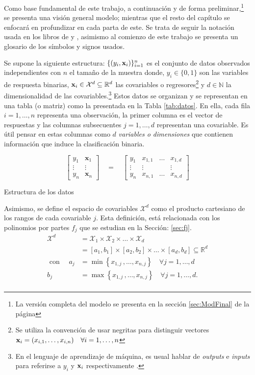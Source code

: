 \documentclass[../Main/Main.tex]{subfiles}
\begin{document}
Como base fundamental de este trabajo, a continuación y de forma preliminar,\footnote{La versión completa del modelo se presenta en la sección \ref{sec:ModFinal} de la página \pageref{sec:ModFinal}} se presenta una visión general modelo; mientras que el resto del capítulo se enfocará en profundizar en cada parta de este. Se trata de seguir la notación usada en los libros de  \citet{hastie2008elements} y \citet{james2013introduction}, asimismo al comienzo de este trabajo se presenta un glosario de los símbolos y signos usados.

Se supone la siguiente estructura: $\{(y_i,\mathbf{x}_i)\}_{i = 1}^n$ es el conjunto de datos observados independientes con $n$ el tamaño de la muestra donde, $y_i \in \{0,1\}$ son las variables de respuesta binarias, $\mathbf{x}_i \in \mathcal{X}^d \subseteq \mathbb{R}^d$ las covariables o regresores\footnote{Se utiliza la convención de usar negritas para distinguir vectores $\mathbf{x}_i = (x_{i,1},\ldots,x_{i,n}) \quad \forall i = 1,\ldots,n$} y $d \in \mathbb{N}$ la dimensionalidad de las covariables.\footnote{En el lenguaje de aprendizaje de máquina, es usual hablar de \textit{outputs} e \textit{inputs} para referirse a $y_i$ y $\mathbf{x}_i$ respectivamente \autocite{alpaydin2014introduction}.} Estos datos se organizan y se representan en una tabla (o matriz) como la presentada en la Tabla \ref{tab:datos}. En ella, cada fila $i = 1,\ldots,n$ representa una observación, la primer columna es el vector de respuestas y las columnas subsecuentes $j = 1,\ldots,d$ representan una covariable. Es útil pensar en estas columnas como $d$ \textit{variables o dimensiones} que contienen información que induce la clasificación binaria.
\begin{table}[h]
$$
\left[\begin{array}{c|c} 
y_1 & \mathbf{x}_1 \\ 
\vdots & \vdots \\ 
y_n & \mathbf{x}_n \end{array}\right] 
\quad = \quad
\left[\begin{array}{c|ccc} 
y_1 & x_{1,1} & \ldots & x_{1,d} \\ 
\vdots & \vdots & ~ & \vdots \\ 
y_n & x_{n,1} & \ldots & x_{n,d}
\end{array}\right]
$$
\caption{Estructura de los datos}
\label{tab:datos}
\end{table}
Asimismo, se define el espacio de covariables $\mathcal{X}^d$ como el producto cartesiano de los rangos de cada covariable $j$. Esta definición, está relacionada con los polinomios por partes $f_j$ que se estudian en la Sección: \ref{sec:fj}. 
\begin{align*}
	\mathcal{X}^d &= \mathcal{X}_1\times\mathcal{X}_2\times\ldots\times\mathcal{X}_d\\
	&= [a_1,b_1]\times[a_2,b_2]\times\ldots\times[a_d,b_d] \subseteq \mathbb{R}^d \\ 
\text{ con } \quad  a_j &= \min\left\{x_{1,j}\, ,\ldots,x_{n,j}\right\} \quad \forall j = 1,\ldots,d \\
	b_j &= \max\left\{x_{1,j}\, ,\ldots,x_{n,j}\right\} \quad \forall j = 1,\ldots,d. \\
\end{align*}
\vfill
\end{document}
